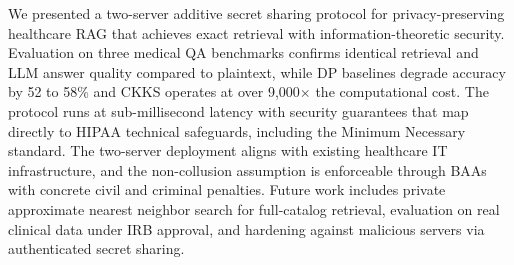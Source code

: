 \documentclass[conference]{IEEEtran}
\begin{document}
We presented a two-server additive secret sharing protocol for
privacy-preserving healthcare RAG that achieves exact retrieval with
information-theoretic security. Evaluation on three medical QA benchmarks
confirms identical retrieval and LLM answer quality compared to plaintext,
while DP baselines degrade accuracy by 52 to 58\% and CKKS operates at
over 9{,}000$\times$ the computational cost. The protocol runs at
sub-millisecond latency with security guarantees that map directly to HIPAA
technical safeguards, including the Minimum Necessary standard. The
two-server deployment aligns with existing healthcare IT infrastructure,
and the non-collusion assumption is enforceable through BAAs with concrete
civil and criminal penalties.
Future work includes private approximate nearest neighbor search for
full-catalog retrieval, evaluation on real clinical data under IRB
approval, and hardening against malicious servers via authenticated
secret sharing.



\balance


\end{document}

